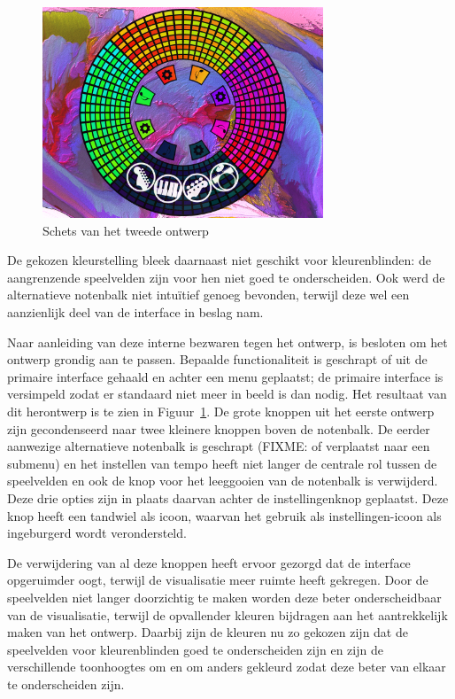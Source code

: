 \documentclass{acm}
\begin{document}
\begin{figure}
  \includegraphics[width=84mm]{img/muziektafel_v2}
  \caption{Schets van het tweede ontwerp}
  \label{fig:muziektafel_v2}
\end{figure}

De gekozen kleurstelling bleek daarnaast niet geschikt voor kleurenblinden: de aangrenzende speelvelden zijn voor hen niet goed te onderscheiden. Ook werd de alternatieve notenbalk niet intuïtief genoeg bevonden, terwijl deze wel een aanzienlijk deel van de interface in beslag nam.

Naar aanleiding van deze interne bezwaren tegen het ontwerp, is besloten om het ontwerp grondig aan te passen. Bepaalde functionaliteit is geschrapt of uit de primaire interface gehaald en achter een menu geplaatst; de primaire interface is versimpeld zodat er standaard niet meer in beeld is dan nodig. Het resultaat van dit herontwerp is te zien in Figuur~\ref{fig:muziektafel_v2}. De grote knoppen uit het eerste ontwerp zijn gecondenseerd naar twee kleinere knoppen boven de notenbalk. De eerder aanwezige alternatieve notenbalk is geschrapt (FIXME: of verplaatst naar een submenu) en het instellen van tempo heeft niet langer de centrale rol tussen de speelvelden en ook de knop voor het leeggooien van de notenbalk is verwijderd. Deze drie opties zijn in plaats daarvan achter de instellingenknop geplaatst. Deze knop heeft een tandwiel als icoon, waarvan het gebruik als instellingen-icoon als ingeburgerd wordt verondersteld.

De verwijdering van al deze knoppen heeft ervoor gezorgd dat de interface opgeruimder oogt, terwijl de visualisatie meer ruimte heeft gekregen. Door de speelvelden niet langer doorzichtig te maken worden deze beter onderscheidbaar van de visualisatie, terwijl de opvallender kleuren bijdragen aan het aantrekkelijk maken van het ontwerp. Daarbij zijn de kleuren nu zo gekozen zijn dat de speelvelden voor kleurenblinden goed te onderscheiden zijn en zijn de verschillende toonhoogtes om en om anders gekleurd zodat deze beter van elkaar te onderscheiden zijn.
\end{document}
